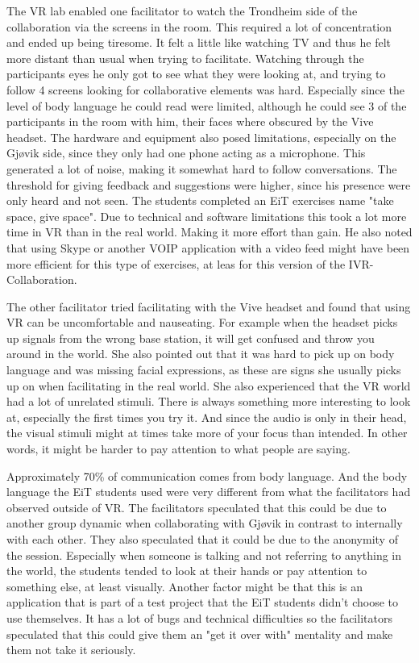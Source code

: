         The VR lab enabled one facilitator to watch the Trondheim side of the collaboration via the screens in the room. This required a lot of concentration and ended up being tiresome. It felt a little like watching TV and thus he felt more distant than usual when trying to facilitate. Watching through the participants eyes he only got to see what they were looking at, and trying to follow 4 screens looking for collaborative elements was hard. Especially since the level of body language he could read were limited, although he could see 3 of the participants in the room with him, their faces where obscured by the Vive headset. The hardware and equipment also posed limitations, especially on the Gjøvik side, since they only had one phone acting as a microphone. This generated a lot of noise, making it somewhat hard to follow conversations. The threshold for giving feedback and suggestions were higher, since his presence were only heard and not seen. The students completed an EiT exercises name "take space, give space". Due to technical and software limitations this took a lot more time in VR than in the real world. Making it more effort than gain. He also noted that using Skype or another VOIP application with a video feed might have been more efficient for this type of exercises, at leas for this version of the IVR-Collaboration.
        
        The other facilitator tried facilitating with the Vive headset and found that using VR can be uncomfortable and nauseating. For example when the headset picks up signals from the wrong base station, it will get confused and throw you around in the world. She also pointed out that it was hard to pick up on body language and was missing facial expressions, as these are signs she usually picks up on when facilitating in the real world. She also experienced that the VR world had a lot of unrelated stimuli. There is always something more interesting to look at, especially the first times you try it. And since the audio is only in their head, the visual stimuli might at times take more of your focus than intended. In other words, it might be harder to pay attention to what people are saying.
        
        Approximately 70\% of communication comes from body language. And the body language the EiT students used were very different from what the facilitators had observed outside of VR. The facilitators speculated that this could be due to another group dynamic when collaborating with Gjøvik in contrast to internally with each other. They also speculated that it could be due to the anonymity of the session. Especially when someone is talking and not referring to anything in the world, the students tended to look at their hands or pay attention to something else, at least visually. Another factor might be that this is an application that is part of a test project that the EiT students didn't choose to use themselves. It has a lot of bugs and technical difficulties so the facilitators speculated that this could give them an "get it over with" mentality and make them not take it seriously.
        
